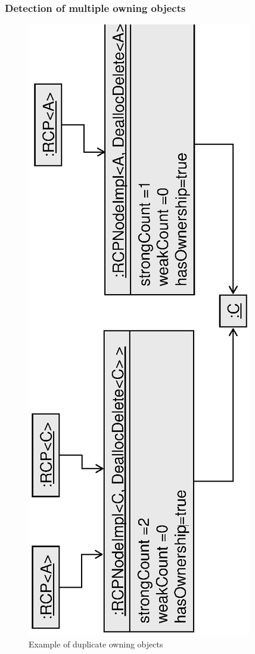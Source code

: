 \documentclass[pdf,ps2pdf,11pt]{SANDreport}
\begin{document}
%
{}\subsubsection{Detection of multiple owning {} objects}
\label{sec:detection-dual-owning-rcps}
%


{\bsinglespace
\begin{figure}
\begin{center}
\includegraphics*[angle=270,scale=0.65]{RCPEx2}
\end{center}
\caption{
\label{fig:RCPEx2}
Example of duplicate owning {} objects}
\end{figure}
\esinglespace}
\end{document}
